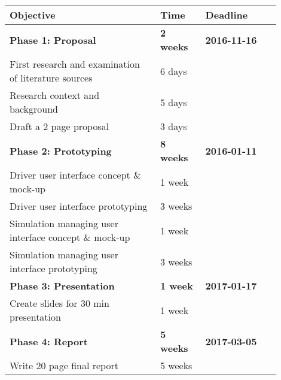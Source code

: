 \documentclass[hidelinks]{sig-alternate}
\begin{document}
\vspace{3mm}
\noindent
\def\arraystretch{1.5}
\begin{tabular}{p{0.5\linewidth} | p{0.15\linewidth} | p{0.25\linewidth}}
\rowcolor{Gray!25}
\textbf{Objective} & \textbf{Time} & \textbf{Deadline} \\\hline

\textbf{Phase 1: Proposal} & \textbf{2 weeks} & \textbf{2016-11-16} \\\hline
First research and examination of literature sources & 6 days &  \\\hline
Research context and background & 5 days &  \\\hline
Draft a 2 page proposal  & 3 days &  \\\hline

\textbf{Phase 2: Prototyping} & \textbf{8 weeks} & \textbf{2016-01-11}  \\\hline
Driver user interface concept \& mock-up& 1 week &  \\\hline
Driver user interface prototyping & 3 weeks&  \\\hline
Simulation managing user interface concept \& mock-up & 1 week&  \\\hline
Simulation managing user interface prototyping & 3 weeks &  \\\hline

\textbf{Phase 3: Presentation} & \textbf{1 week} & \textbf{2017-01-17} \\\hline
Create slides for 30 min presentation & 1 week & \\\hline

\textbf{Phase 4: Report} & \textbf{5 weeks} & \textbf{2017-03-05} \\\hline
Write 20 page final report & 5 weeks &

\end{tabular}
\vspace{3mm}




\end{document}
